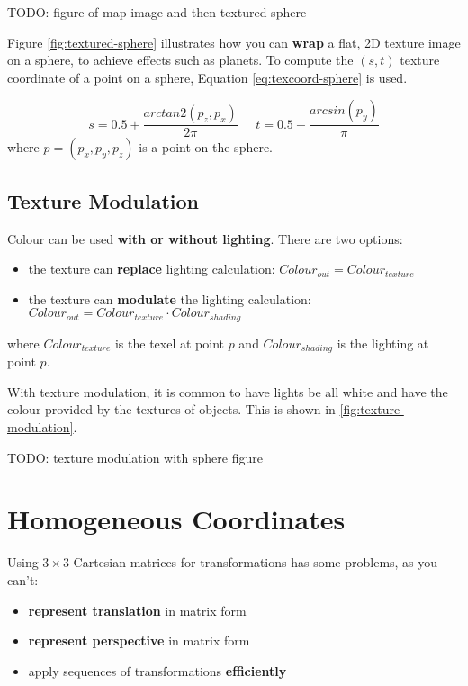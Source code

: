 \documentclass{article}
\begin{document}
TODO: figure of map image and then textured sphere

Figure \ref{fig:textured-sphere} illustrates how you can \textbf{wrap} a flat, 2D texture image on a sphere, to achieve effects such as planets. To compute the $(s, t)$ texture coordinate of a point on a sphere, Equation \ref{eq:texcoord-sphere} is used.

\begin{equation}
	s = 0.5 + \frac{arctan2(p_z, p_x)}{2 \pi} \;\;\;\;\;
	t = 0.5 - \frac{arcsin(p_y)}{\pi}
	\label{eq:texcoord-sphere}
\end{equation}
where $p = (p_x, p_y, p_z)$ is a point on the sphere.

\subsection{Texture Modulation}

Colour can be used \textbf{with or without lighting}. There are two options:
\begin{itemize}
	\item the texture can \textbf{replace} lighting calculation: $Colour_{out} = Colour_{texture}$
	\item the texture can \textbf{modulate} the lighting calculation: $Colour_{out} = Colour_{texture} \cdot Colour_{shading}$
\end{itemize} 
where $Colour_{texture}$ is the texel at point $p$ and $Colour_{shading}$ is the lighting at point $p$. 

With texture modulation, it is common to have lights be all white and have the colour provided by the textures of objects. This is shown in \ref{fig:texture-modulation}.

TODO: texture modulation with sphere figure

\section{Homogeneous Coordinates}

Using $3 \times 3$ Cartesian matrices for transformations has some problems, as you can't:
\begin{itemize}
	\item \textbf{represent translation} in matrix form
	\item \textbf{represent perspective} in matrix form	
	\item apply sequences of transformations \textbf{efficiently}
\end{itemize}
\end{document}
